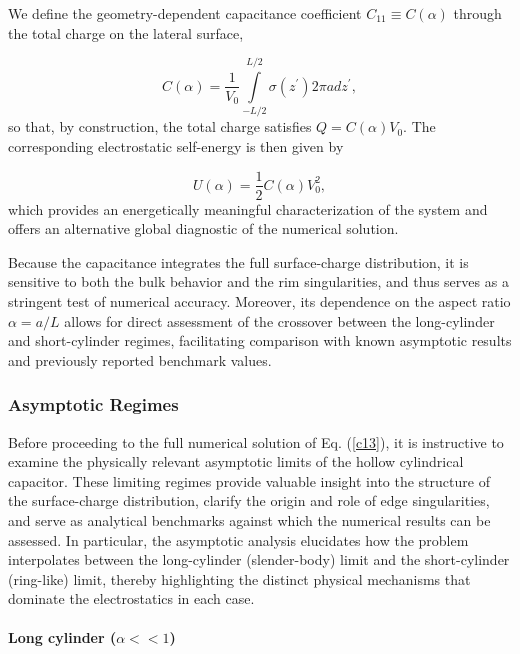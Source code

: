 \documentclass[12pt]{article}
\begin{document}
We define the geometry-dependent capacitance coefficient $C_{11}\equiv
C(\alpha)$ through the total charge on the lateral surface,%

\begin{equation}
C(\alpha)=\frac{1}{V_{0}}\int\limits_{-L/2}^{L/2}\sigma(z^{\prime})2\pi
adz^{\prime}, \label{c13}%
\end{equation}
so that, by construction, the total charge satisfies $Q=C(\alpha)V_{0}$. The
corresponding electrostatic self-energy is then given by%

\begin{equation}
U(\alpha)=\frac{1}{2}C(\alpha)V_{0}^{2}, \label{c13a}%
\end{equation}
which provides an energetically meaningful characterization of the system and
offers an alternative global diagnostic of the numerical solution.

Because the capacitance integrates the full surface-charge distribution, it is
sensitive to both the bulk behavior and the rim singularities, and thus serves
as a stringent test of numerical accuracy. Moreover, its dependence on the
aspect ratio $\alpha=a/L$ allows for direct assessment of the crossover
between the long-cylinder and short-cylinder regimes, facilitating comparison
with known asymptotic results and previously reported benchmark values.

\subsubsection{Asymptotic Regimes}

Before proceeding to the full numerical solution of Eq. (\ref{c13}), it is
instructive to examine the physically relevant asymptotic limits of the hollow
cylindrical capacitor. These limiting regimes provide valuable insight into
the structure of the surface-charge distribution, clarify the origin and role
of edge singularities, and serve as analytical benchmarks against which the
numerical results can be assessed. In particular, the asymptotic analysis
elucidates how the problem interpolates between the long-cylinder
(slender-body) limit and the short-cylinder (ring-like) limit, thereby
highlighting the distinct physical mechanisms that dominate the electrostatics
in each case.

\paragraph{Long cylinder ($\alpha<<1$)}
\end{document}
